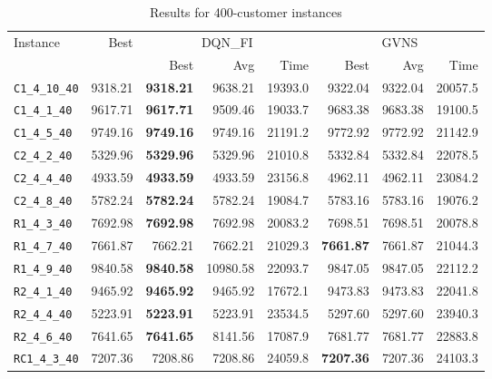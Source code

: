 \begin{table}[ht]
\centering
\small
\setlength{\tabcolsep}{5pt}
\caption{Results for 400-customer instances}
\vspace{4mm}
\begin{adjustbox}{width=\textwidth}
\begin{tabular}{l r r r r @{\hspace{8pt}} r r r @{\hspace{8pt}}}
\toprule
\multirow{2}{*}{Instance} & \multirow{2}{*}{Best} & \multicolumn{3}{c}{DQN\_FI} & \multicolumn{3}{c}{GVNS} \\
\cmidrule(lr){3-5} \cmidrule(lr){6-8}
 &  & Best & Avg & Time & Best & Avg & Time \\
\midrule
\texttt{C1\_4\_10\_40} & 9318.21 & \textbf{9318.21} & 9638.21 & 19393.0 & 9322.04 & 9322.04 & 20057.5 \\
\texttt{C1\_4\_1\_40} & 9617.71 & \textbf{9617.71} & 9509.46 & 19033.7 & 9683.38 & 9683.38 & 19100.5 \\
\texttt{C1\_4\_5\_40} & 9749.16 & \textbf{9749.16} & 9749.16 & 21191.2 & 9772.92 & 9772.92 & 21142.9 \\
\texttt{C2\_4\_2\_40} & 5329.96 & \textbf{5329.96} & 5329.96 & 21010.8 & 5332.84 & 5332.84 & 22078.5 \\
\texttt{C2\_4\_4\_40} & 4933.59 & \textbf{4933.59} & 4933.59 & 23156.8 & 4962.11 & 4962.11 & 23084.2 \\
\texttt{C2\_4\_8\_40} & 5782.24 & \textbf{5782.24} & 5782.24 & 19084.7 & 5783.16 & 5783.16 & 19076.2 \\
\texttt{R1\_4\_3\_40} & 7692.98 & \textbf{7692.98} & 7692.98 & 20083.2 & 7698.51 & 7698.51 & 20078.8 \\
\texttt{R1\_4\_7\_40} & 7661.87 & 7662.21 & 7662.21 & 21029.3 & \textbf{7661.87} & 7661.87 & 21044.3 \\
\texttt{R1\_4\_9\_40} & 9840.58 & \textbf{9840.58} & 10980.58 & 22093.7 & 9847.05 & 9847.05 & 22112.2 \\
\texttt{R2\_4\_1\_40} & 9465.92 & \textbf{9465.92} & 9465.92 & 17672.1 & 9473.83 & 9473.83 & 22041.8 \\
\texttt{R2\_4\_4\_40} & 5223.91 & \textbf{5223.91} & 5223.91 & 23534.5 & 5297.60 & 5297.60 & 23940.3 \\
\texttt{R2\_4\_6\_40} & 7641.65 & \textbf{7641.65} & 8141.56 & 17087.9 & 7681.77 & 7681.77 & 22883.8 \\
\texttt{RC1\_4\_3\_40} & 7207.36 & 7208.86 & 7208.86 & 24059.8 & \textbf{7207.36} & 7207.36 & 24103.3 \\

\end{tabular}
\end{adjustbox}
\end{table}
